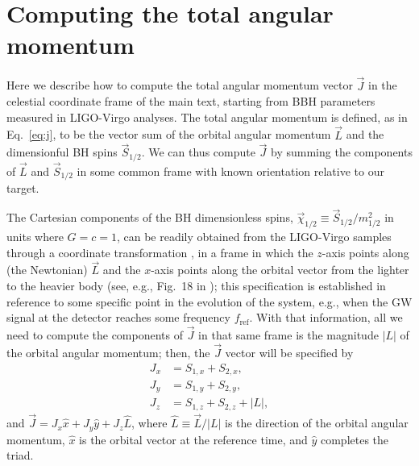 \documentclass[aps,prd,twocolumn,superscriptaddress,preprintnumbers,floatfix,nofootinbib]{revtex4-2}
\begin{document}
\appendix

\section{Computing the total angular momentum}
\label{app:j}

Here we describe how to compute the total angular momentum vector $\vec{J}$ in the celestial coordinate frame of the main text, starting from \ac{BBH} parameters measured in LIGO-Virgo analyses.
The total angular momentum is defined, as in Eq.~\eqref{eq:j}, to be the vector sum of the orbital angular momentum $\vec{L}$ and the dimensionful \ac{BH} spins $\vec{S}_{1/2}$.
We can thus compute $\vec{J}$ by summing the components of $\vec{L}$ and $\vec{S}_{1/2}$ in some common frame with known orientation relative to our target.

The Cartesian components of the \ac{BH} dimensionless spins, $\vec{\chi}_{1/2} \equiv \vec{S}_{1/2} / m_{1/2}^2$ in units where $G=c=1$, can be readily obtained from the LIGO-Virgo samples through a coordinate transformation \cite{LALSuite:spins}, in a frame in which the $z$-axis points along (the Newtonian) $\vec{L}$ and the $x$-axis points along the orbital vector from the lighter to the heavier body (see, e.g., Fig.~18 in \cite{Isi:2022mbx}); this specification is established in reference to some specific point in the evolution of the system, e.g., when the \ac{GW} signal at the detector reaches some frequency $f_\mathrm{ref}$.
With that information, all we need to compute the components of $\vec{J}$ in that same frame is the magnitude $|L|$ of the orbital angular momentum; then, the $\vec{J}$ vector will be specified by
\begin{subequations}
\label{eq:jcomp}
\begin{align}
J_x &= S_{1,x} + S_{2,x}, \\
J_y &= S_{1,y} + S_{2,y}, \\
J_z &= S_{1,z} + S_{2,z} + |L|,
\end{align}
\end{subequations}
and $\vec{J} = J_x \hat{x} + J_y \hat{y} + J_z \hat{L}$, where $\hat{L} \equiv \vec{L}/|L|$ is the direction of the orbital angular momentum, $\hat{x}$ is the orbital vector at the reference time, and $\hat{y}$ completes the triad.
\end{document}
